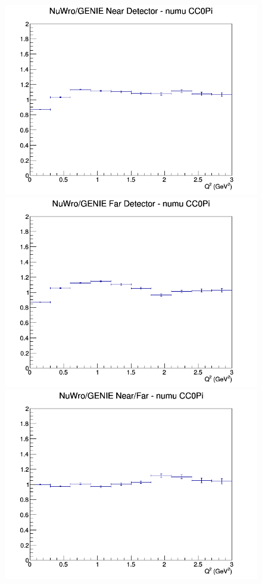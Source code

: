 \begin{figure}[h]
\endminipage
\newline
{}
\includegraphics[width=\linewidth]{Q2/nominal/ratios/CC0Pi_NuWro_GENIE_numu_near_Q2.png}
\endminipage
{}
\includegraphics[width=\linewidth]{Q2/nominal/ratios/CC0Pi_NuWro_GENIE_numu_far_Q2.png}
\endminipage
{}
\includegraphics[width=\linewidth]{Q2/nominal/ratios/CC0Pi_NuWro_GENIE_numu_NF_Q2.png}
\endminipage
\newline
\end{figure}
\clearpage
